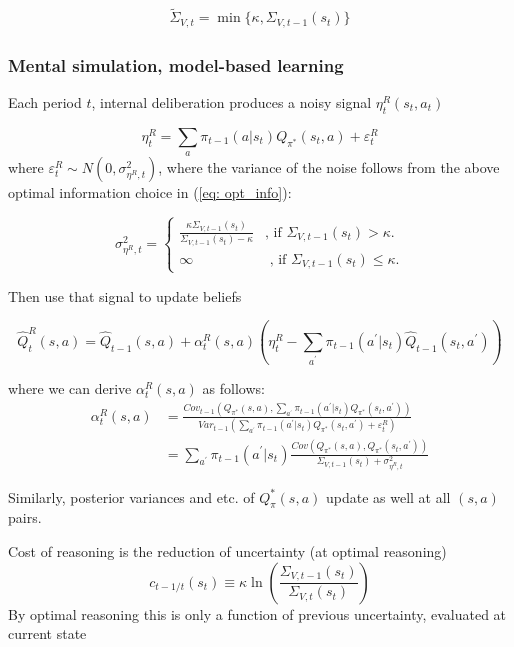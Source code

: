 \documentclass[12pt]{article}%
\begin{document}
\begin{align}
\label{eq: opt_info}\widetilde{\Sigma}_{V,t} = \min\{ \kappa, \Sigma
_{V,t-1}(s_{t}) \}
\end{align}


\subsubsection{Mental simulation, model-based learning}

Each period $t$, internal deliberation produces a noisy signal $\eta_{t}%
^{R}(s_{t},a_{t})$%

\[
\eta_{t}^{R}=\sum_{a}\pi_{t-1}(a|s_{t})Q_{\pi^{*}}(s_{t},a )+\varepsilon
_{t}^{R}%
\]
where $\varepsilon_{t}^{R} \sim N(0, \sigma_{\eta^{R},t}^{2})$, where the
variance of the noise follows from the above optimal information choice in
(\ref{eq: opt_info}):%

\[
\sigma_{\eta^{R},t}^{2}=
\begin{cases}
\frac{\kappa{\Sigma}_{V,t-1}(s_{t})}{ {\Sigma}_{V,t-1}(s_{t})-\kappa} & \text{
, if } {\Sigma}_{V,t-1}(s_{t}) > \kappa.\\
\infty & \text{ , if } {\Sigma}_{V,t-1}(s_{t}) \leq\kappa.
\end{cases}
\]


Then use that signal to update beliefs%

\[
\widehat{Q}_{t}^{R}(s,a)=\widehat{Q}_{t-1}(s,a)+\alpha_{t}^{R}(s,a)\left(
\eta_{t}^{R}-\sum_{a^{\prime}}\pi_{t-1}(a^{\prime}|s_{t})\widehat{Q}%
_{t-1}(s_{t},a^{\prime})\right)
\]


where we can derive $\alpha_{t}^{R}(s,a)$ as follows:%
\begin{align*}
\alpha_{t}^{R}(s,a)  &  =\frac{Cov_{t-1}(Q_{\pi^{*}}(s,a),\sum_{a^{\prime}}%
\pi_{t-1}(a^{\prime}|s_{t})Q_{\pi^{*}}(s_{t},a^{\prime}))}{Var_{t-1}(
\sum_{a^{\prime}}\pi_{t-1}(a^{\prime}|s_{t})Q_{\pi^{*}}(s_{t},a^{\prime
})+\varepsilon_{t}^{R})}\\
&  =\sum_{a^{\prime}}\pi_{t-1}(a^{\prime}|s_{t})\frac{Cov(Q_{\pi^{*}%
}(s,a),Q_{\pi^{*}}(s_{t},a^{\prime}))}{\Sigma_{V,t-1}(s_{t}) + \sigma
_{\eta^{R},t}^{2}}%
\end{align*}


Similarly, posterior variances and etc. of $Q_{\pi}^{\ast}(s,a)$ update as
well at all $(s,a)$ pairs.

Cost of reasoning is the reduction of uncertainty (at optimal reasoning)
\[
c_{t-1/t}(s_{t})\equiv\kappa\ln\left(  \frac{\Sigma_{V,t-1}(s_{t})}%
{\Sigma_{V,t} (s_{t})}\right)
\]
By optimal reasoning this is only a function of previous uncertainty,
evaluated at current state%
\end{document}
